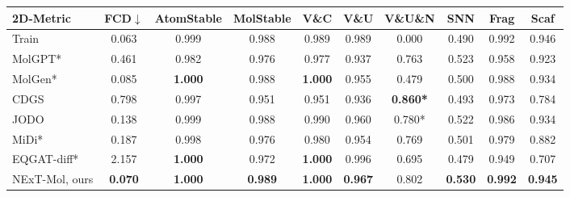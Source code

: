 \begin{tabular}{lccccccccc}\toprule
2D-Metric                      & FCD$\downarrow$              & AtomStable                            & MolStable                    & V\&C                                  & V\&U                         & V\&U\&N                      & SNN                          & Frag                         & Scaf                         \\ \midrule
{\color{gray}Train}   & {\color{gray}0.063} & {\color{gray}0.999}          & {\color{gray}0.988} & {\color{gray}0.989}          & {\color{gray}0.989} & {\color{gray}0.000} & {\color{gray}0.490} & {\color{gray}0.992} & {\color{gray}0.946} \\
MolGPT* & 0.461 & 0.982          & 0.976 & 0.977          & 0.937 & 0.763 & 0.523 & 0.958 & 0.923 \\
MolGen* & 0.085 & \textbf{1.000} & 0.988 & \textbf{1.000} & 0.955 & 0.479 & 0.500 & 0.988 & 0.934 \\
CDGS                           & 0.798                        & 0.997                                 & 0.951                        & 0.951                                 & 0.936                        & \textbf{0.860*}              & 0.493                        & 0.973                        & 0.784                        \\
JODO                           & 0.138                        & 0.999                                 & 0.988                        & 0.990                                 & 0.960                        & 0.780*                       & 0.522                        & 0.986                        & 0.934                        \\
MiDi*                          & 0.187                        & 0.998                                 & 0.976                        & 0.980                                 & 0.954                        & 0.769                        & 0.501                        & 0.979                        & 0.882                        \\
EQGAT-diff*                          & 2.157                        & \textbf{1.000}                                 & 0.972                        & \textbf{1.000}                                 & 0.996                        & 0.695                        & 0.479                        & 0.949                        & 0.707                        \\
NExT-Mol, ours                 & \textbf{0.070}               & \textbf{1.000}                        & \textbf{0.989}               & \textbf{1.000}                        & \textbf{0.967}               & 0.802                        & \textbf{0.530}               & \textbf{0.992}               & \textbf{0.945}               \\\midrule

\end{tabular}
